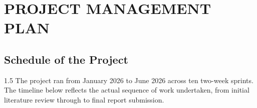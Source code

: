 \chapter{PROJECT MANAGEMENT PLAN}

\section{Schedule of the Project}

\begin{spacing}{1.5}
The project ran from January 2026 to June 2026 across ten two-week sprints. The timeline below reflects the actual sequence of work undertaken, from initial literature review through to final report submission.
\end{spacing}


